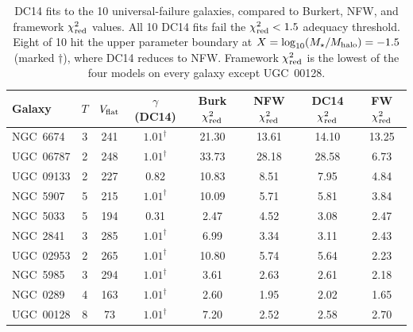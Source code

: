 \documentclass[linenumbers]{aastex701}
\newcommand{\Vflat}{V_{\rm flat}}
\newcommand{\Mstar}{M_\star}
\newcommand{\Mhalo}{M_{\rm halo}}
\newcommand{\chired}{\chi^2_{\rm red}}
\begin{document}
\begin{table}
\centering
\small
\caption{DC14 fits to the 10 universal-failure galaxies, compared to Burkert, NFW, and framework $\chired$ values. All 10 DC14 fits fail the $\chired < 1.5$ adequacy threshold. Eight of 10 hit the upper parameter boundary at $X = \log_{10}(\Mstar/\Mhalo) = -1.5$ (marked $\dagger$), where DC14 reduces to NFW. Framework $\chired$ is the lowest of the four models on every galaxy except UGC~00128.}\label{tab:dc14}
\begin{tabular}{l c c c c c c c}
\hline\hline
Galaxy     & $T$ & $\Vflat$ & $\gamma$ (DC14) & Burk $\chired$ & NFW $\chired$ & DC14 $\chired$ & FW $\chired$ \\
\hline
NGC~6674   & 3 & 241 & $1.01^\dagger$ & 21.30 & 13.61 & 14.10 & 13.25 \\
UGC~06787  & 2 & 248 & $1.01^\dagger$ & 33.73 & 28.18 & 28.58 & 6.73  \\
UGC~09133  & 2 & 227 & 0.82           & 10.83 & 8.51  & 7.95  & 4.84  \\
NGC~5907   & 5 & 215 & $1.01^\dagger$ & 10.09 & 5.71  & 5.81  & 3.84  \\
NGC~5033   & 5 & 194 & 0.31           & 2.47  & 4.52  & 3.08  & 2.47  \\
NGC~2841   & 3 & 285 & $1.01^\dagger$ & 6.99  & 3.34  & 3.11  & 2.43  \\
UGC~02953  & 2 & 265 & $1.01^\dagger$ & 10.80 & 5.74  & 5.64  & 2.23  \\
NGC~5985   & 3 & 294 & $1.01^\dagger$ & 3.61  & 2.63  & 2.61  & 2.18  \\
NGC~0289   & 4 & 163 & $1.01^\dagger$ & 2.60  & 1.95  & 2.02  & 1.65  \\
UGC~00128  & 8 & 73  & $1.01^\dagger$ & 7.20  & 2.52  & 2.58  & 2.70  \\
\hline
\end{tabular}
\end{table}


\clearpage


\end{document}
